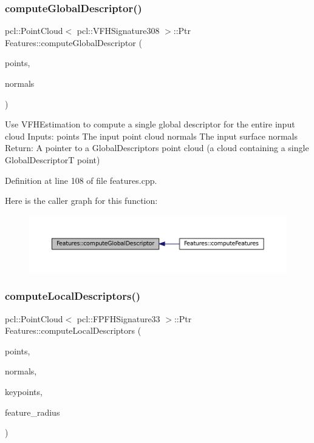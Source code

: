 \subsubsection{\texorpdfstring{compute\+Global\+Descriptor()}{computeGlobalDescriptor()}}
{\footnotesize\ttfamily pcl\+::\+Point\+Cloud$<$ pcl\+::\+V\+F\+H\+Signature308 $>$\+::Ptr Features\+::compute\+Global\+Descriptor (\begin{DoxyParamCaption}\item[{const pcl\+::\+Point\+Cloud$<$ pcl\+::\+Point\+X\+Y\+Z\+R\+GB $>$\+::Ptr \&}]{points,  }\item[{const pcl\+::\+Point\+Cloud$<$ pcl\+::\+Normal $>$\+::Ptr \&}]{normals }\end{DoxyParamCaption})}

Use V\+F\+H\+Estimation to compute a single global descriptor for the entire input cloud Inputs\+: points The input point cloud normals The input surface normals Return\+: A pointer to a Global\+Descriptors point cloud (a cloud containing a single Global\+DescriptorT point) 

Definition at line 108 of file features.\+cpp.

Here is the caller graph for this function\+:
\nopagebreak
\begin{figure}[H]
\begin{center}
\leavevmode
\includegraphics[width=350pt]{class_features_a6e7efba994adbfa03682e796ed932a99_icgraph}
\end{center}
\end{figure}
\hypertarget{class_features_a9a35a8508f21553be97a868a167ac2de}{}\label{class_features_a9a35a8508f21553be97a868a167ac2de} 
\subsubsection{\texorpdfstring{compute\+Local\+Descriptors()}{computeLocalDescriptors()}}
{\footnotesize\ttfamily pcl\+::\+Point\+Cloud$<$ pcl\+::\+F\+P\+F\+H\+Signature33 $>$\+::Ptr Features\+::compute\+Local\+Descriptors (\begin{DoxyParamCaption}\item[{const pcl\+::\+Point\+Cloud$<$ pcl\+::\+Point\+X\+Y\+Z\+R\+GB $>$\+::Ptr \&}]{points,  }\item[{const pcl\+::\+Point\+Cloud$<$ pcl\+::\+Normal $>$\+::Ptr \&}]{normals,  }\item[{const pcl\+::\+Point\+Cloud$<$ pcl\+::\+Point\+X\+Y\+Z\+R\+GB $>$\+::Ptr \&}]{keypoints,  }\item[{float}]{feature\+\_\+radius }\end{DoxyParamCaption})}

